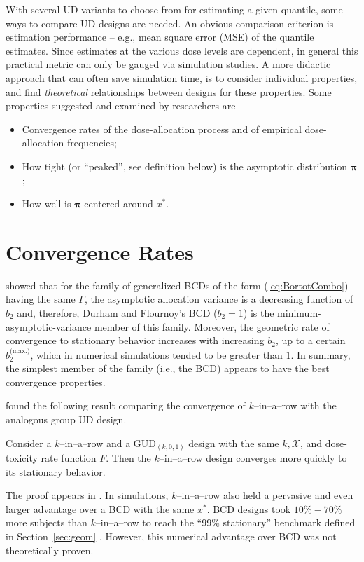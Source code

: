 With several UD variants to choose from for estimating a given quantile, some ways to compare UD designs are needed. An obvious comparison criterion is estimation performance -- e.g., mean square error (MSE) of the quantile estimates. Since estimates at the various dose levels are dependent, in general this practical metric can only be gauged via simulation studies. A more didactic approach that can often save simulation time, is to consider individual properties, and find \emph{theoretical} relationships between designs for these properties. Some properties suggested and examined by researchers are
%
\begin{itemize}
\item Convergence rates of the dose-allocation process and of empirical dose-allocation frequencies;
\item How tight (or ``peaked'', see definition below) is the asymptotic distribution $\boldsymbol{\pi}$;
\item How well is $\boldsymbol{\pi}$ centered around $x^*$.
\end{itemize}

\section{Convergence Rates}

\cite{Bort:Giov:Upan:2005} showed that for the family of generalized BCDs of the form (\ref{eq:BortotCombo}) having the same $\Gamma$, the asymptotic allocation variance is a decreasing function of $b_2$ and, therefore, Durham and Flournoy's BCD ($b_2=1$) is the minimum-asymptotic-variance member of this family. Moreover, the geometric rate of convergence to stationary behavior increases with increasing $b_2$, up to a certain $b_2^\textrm{(max.)}$, which in numerical simulations tended to be greater than $1$. In summary, the simplest member of the family (i.e., the BCD) appears to have the best convergence properties.

\cite{Oron:Hoff:thek:2009} found the following result comparing the convergence of $k$--in--a--row with the analogous group UD design.
%
\begin{thm}\label{thm:krgudconv} Consider a $k$--in--a--row and a GUD$_{(k,0,1)}$ design with the same $k,\mathcal{X}$, and dose-toxicity rate function $F$. Then the $k$--in--a--row design converges more quickly to its stationary behavior.\end{thm}
%
\noindent The proof appears in \cite{Oron:Hoff:thek:2009}. In simulations, $k$--in--a--row also held a pervasive and even larger advantage over a BCD with the same $x^*$. BCD designs took $10\%-70\%$ more subjects than $k$--in--a--row to reach the ``$99\%$ stationary'' benchmark defined in Section~\ref{sec:geom} \citep{Oron:Hoff:thek:2009}. However, this numerical advantage over BCD was not theoretically proven.

